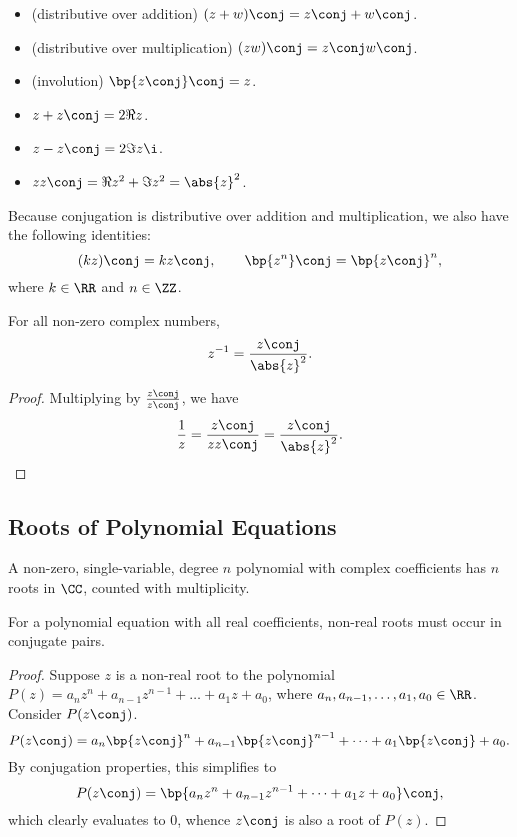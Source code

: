 \begin{fact}
    \phantom{.}
    \begin{itemize}
        \item (distributive over addition) $(z + w)\conj = z\conj + w\conj$.
        \item (distributive over multiplication) $(zw)\conj = z\conj w\conj$.
        \item (involution) $\bp{z\conj}\conj = z$.
        \item $z + z\conj = 2\Re{z}$.
        \item $z - z\conj = 2\Im{z} \i$.
        \item $z z\conj = \Re{z}^2 + \Im{z}^2 = \abs{z}^2$.
    \end{itemize}
\end{fact}
\begin{remark}
    Because conjugation is distributive over addition and multiplication, we also have the following identities: \[(kz)\conj = k z\conj, \qquad \bp{z^n}\conj = \bp{z\conj}^n,\] where $k \in \RR$ and $n \in \ZZ$.
\end{remark}

\begin{proposition}
    For all non-zero complex numbers, \[z^{-1} = \frac{z\conj}{\abs{z}^2}.\]
\end{proposition}
\begin{proof}
    Multiplying by $\frac{z\conj}{z\conj}$, we have \[\frac{1}{z} = \frac{z\conj}{z z\conj} = \frac{z\conj}{\abs{z}^2}.\]
\end{proof}

\subsection{Roots of Polynomial Equations}

\begin{theorem}
    A non-zero, single-variable, degree $n$ polynomial with complex coefficients has $n$ roots in $\CC$, counted with multiplicity.
\end{theorem}

\begin{theorem}
    For a polynomial equation with all real coefficients, non-real roots must occur in conjugate pairs.
\end{theorem}
\begin{proof}
    Suppose $z$ is a non-real root to the polynomial $P(z) = a_n z^n + a_{n-1} z^{n-1} + \dots + a_1 z + a_0$, where $a_n, a_{n-1}, \dots, a_1, a_0 \in \RR$. Consider $P(z\conj)$. \[P(z\conj) = a_n \bp{z\conj}^n + a_{n-1} \bp{z\conj}^{n-1} + \dots + a_1 \bp{z\conj} + a_0.\] By conjugation properties, this simplifies to \[P(z\conj) = \bp{a_n z^n + a_{n-1} z^{n-1} + \dots + a_1 z + a_0}\conj,\] which clearly evaluates to 0, whence $z\conj$ is also a root of $P(z)$.
\end{proof}

